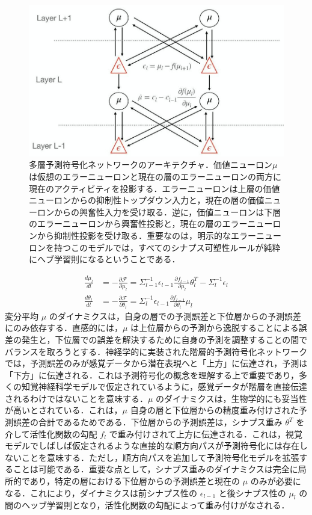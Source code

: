\documentclass[a4paper, titlepage]{jsarticle}
\begin{document}
\begin{figure}[htbp]
   \centering
   \includegraphics[scale=0.4]{PC_layer.jpeg}
   \caption{
      多層予測符号化ネットワークのアーキテクチャ．価値ニューロン$\mu$は仮想のエラーニューロンと現在の層のエラーニューロンの両方に現在のアクティビティを投影する．エラーニューロンは上層の価値ニューロンからの抑制性トップダウン入力と，現在の層の価値ニューロンからの興奮性入力を受け取る．逆に，価値ニューロンは下層のエラーニューロンから興奮性投影と，現在の層のエラーニューロンから抑制性投影を受け取る．重要なのは，明示的なエラーニューロンを持つこのモデルでは，すべてのシナプス可塑性ルールが純粋にへブ学習則になるということである．
   }
   \label{PC_layer}
\end{figure}

\begin{align}
   \frac{d\mu_l}{dl}&=-\frac{\partial\mathcal{F}}{\partial\mu_l}=\Sigma_{l-1}^{-1}\epsilon_{l-1}\frac{\partial f_{l-1}}{\partial\mu_l}\theta_l^T-\Sigma_l^{-1}\epsilon_l \\
   \frac{d\theta_l}{dl}&=-\frac{\partial\mathcal{F}}{\partial\theta_l}=\Sigma_l^{-1}\epsilon_{l-1}\frac{\partial f_{l-1}}{\partial\theta_l}\mu_l
\end{align}
変分平均 $\mu$ のダイナミクスは，自身の層での予測誤差と下位層からの予測誤差にのみ依存する．直感的には，$\mu$ は上位層からの予測から逸脱することによる誤差の発生と，下位層での誤差を解決するために自身の予測を調整することの間でバランスを取ろうとする．神経学的に実装された階層的予測符号化ネットワークでは，予測誤差のみが感覚データから潜在表現へと「上方」に伝達され，予測は「下方」に伝達される．これは予測符号化の概念を理解する上で重要であり，多くの知覚神経科学モデルで仮定されているように，感覚データが階層を直接伝達されるわけではないことを意味する．$\mu$ のダイナミクスは，生物学的にも妥当性が高いとされている．これは，$\mu$ 自身の層と下位層からの精度重み付けされた予測誤差の合計であるためである．下位層からの予測誤差は，シナプス重み $\theta^T$ を介して活性化関数の勾配 $f_l$ で重み付けされて上方に伝達される．これは，視覚モデルでしばしば仮定されるような直接的な順方向パスが予測符号化には存在しないことを意味する．ただし，順方向パスを追加して予測符号化モデルを拡張することは可能である．重要な点として，シナプス重みのダイナミクスは完全に局所的であり，特定の層における下位層からの予測誤差と現在の $\mu$ のみが必要になる．これにより，ダイナミクスは前シナプス性の $\epsilon_{l-1}$ と後シナプス性の $\mu_l$ の間のヘッブ学習則となり，活性化関数の勾配によって重み付けがなされる．
\end{document}
